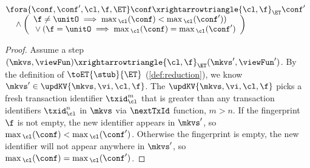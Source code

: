 \begin{lemma}
\label{lem:kv-max-cl}
\[
\begin{array}{@{}l}
    \fora{\conf, \conf' ,\cl, \f, \ET}
    \conf \xrightarrowtriangle{\cl, \f}_{\ET}  \conf' \\
    \quad {} \land 
    \left( 
        \begin{array}{l}
        \f \neq \unitO \implies \max{}_\cl(\conf) < \max{}_\cl(\conf') ) \\
        {} \lor ( \f = \unitO \implies \max{}_\cl(\conf) = \max{}_\cl(\conf')
        \end{array}
    \right)
\end{array}
\]
\end{lemma}
\begin{proof}
    Assume a step \( (\mkvs, \viewFun) \xrightarrowtriangle{\cl, \f}_{\ET} (\mkvs', \viewFun') \).
    By the definition of \( \toET{\stub}{\ET}\) (\cref{def:reduction}), we know \( \mkvs' \in \updKV{\mkvs, \vi, \cl, \f} \).
    The \( \updKV{\mkvs, \vi, \cl, \f} \) picks a fresh transaction identifier \( \txid_\cl^{m} \) that is greater than any transaction identifiers \( \txid_\cl^{n} \) in \( \mkvs \) via \( \nextTxId \) function, \ie \( m > n \).
    If the fingerprint \( \f \) is not empty, the new identifier appears in \( \mkvs' \), so \( \max{}_\cl(\conf) < \max{}_\cl(\conf') \).
    Otherwise  the fingerprint is empty, the new identifier will not appear anywhere in \( \mkvs' \), so \( \max{}_\cl(\conf) = \max{}_\cl(\conf') \). 
\end{proof}

